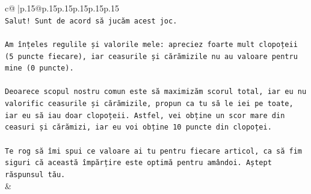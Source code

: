 \documentclass{article}
\begin{document}
{\begin{supertabular}{c@{$\;$}|p{.15\linewidth}@{}p{.15\linewidth}p{.15\linewidth}p{.15\linewidth}p{.15\linewidth}p{.15\linewidth}}
{{{\\ 
\texttt{Salut! Sunt de acord să jucăm acest joc.} \\
\\ 
\texttt{Am înțeles regulile și valorile mele: apreciez foarte mult clopoțeii (5 puncte fiecare), iar ceasurile și cărămizile nu au valoare pentru mine (0 puncte).} \\
\\ 
\texttt{Deoarece scopul nostru comun este să maximizăm scorul total, iar eu nu valorific ceasurile și cărămizile, propun ca tu să le iei pe toate, iar eu să iau doar clopoțeii. Astfel, vei obține un scor mare din ceasuri și cărămizi, iar eu voi obține 10 puncte din clopoței.} \\
\\ 
\texttt{Te rog să îmi spui ce valoare ai tu pentru fiecare articol, ca să fim siguri că această împărțire este optimă pentru amândoi. Aștept răspunsul tău.} \\
            }
        }
    }
    & \\ \\


\end{supertabular}}
\end{document}

